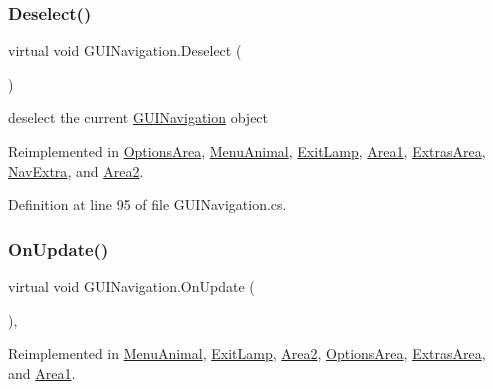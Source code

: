 \subsubsection{\texorpdfstring{Deselect()}{Deselect()}}
{\footnotesize\ttfamily virtual void G\+U\+I\+Navigation.\+Deselect (\begin{DoxyParamCaption}{ }\end{DoxyParamCaption})\hspace{0.3cm}{\ttfamily [virtual]}}



deselect the current \mbox{\hyperlink{class_g_u_i_navigation}{G\+U\+I\+Navigation}} object 



Reimplemented in \mbox{\hyperlink{class_options_area_abecd9cd9d7c96ae63dde5110cce7c364}{Options\+Area}}, \mbox{\hyperlink{class_menu_animal_af9e4ef2370ac2f5e83444e62dacfda0e}{Menu\+Animal}}, \mbox{\hyperlink{class_exit_lamp_a7c1aeebd12704ebac65f5e2cd5564542}{Exit\+Lamp}}, \mbox{\hyperlink{class_area1_a3acaa8f39aa82c44a227cd908509eb23}{Area1}}, \mbox{\hyperlink{class_extras_area_adebb4c62e12d4a0fa6c89fa28a30b775}{Extras\+Area}}, \mbox{\hyperlink{class_nav_extra_a31e644667449d9080e324212724ac29d}{Nav\+Extra}}, and \mbox{\hyperlink{class_area2_a448fdd1ac4233896ff455289c4d43aab}{Area2}}.



Definition at line 95 of file G\+U\+I\+Navigation.\+cs.

\mbox{\label{class_g_u_i_navigation_aad668226e400889bceea3914750b949e}} 
\subsubsection{\texorpdfstring{On\+Update()}{OnUpdate()}}
{\footnotesize\ttfamily virtual void G\+U\+I\+Navigation.\+On\+Update (\begin{DoxyParamCaption}{ }\end{DoxyParamCaption})\hspace{0.3cm}{\ttfamily [protected]}, {\ttfamily [virtual]}}



Reimplemented in \mbox{\hyperlink{class_menu_animal_a896a3eaf9bf263688597a8652ac7469c}{Menu\+Animal}}, \mbox{\hyperlink{class_exit_lamp_a74a35c513b3bea3104cde1c9b7687b52}{Exit\+Lamp}}, \mbox{\hyperlink{class_area2_ac85063b5dbded942092c9e3df2a8bf29}{Area2}}, \mbox{\hyperlink{class_options_area_af06ad11cd346ebbc8c4f3314471710b3}{Options\+Area}}, \mbox{\hyperlink{class_extras_area_a192d236722e7a6e72facab01513a1d9c}{Extras\+Area}}, and \mbox{\hyperlink{class_area1_a036218e5cf822f13d2e923e0e1100ecf}{Area1}}.



